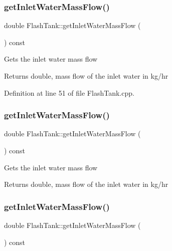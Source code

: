 \subsubsection{\texorpdfstring{get\+Inlet\+Water\+Mass\+Flow()}{getInletWaterMassFlow()}\hspace{0.1cm}{\footnotesize\ttfamily [1/3]}}
{\footnotesize\ttfamily double Flash\+Tank\+::get\+Inlet\+Water\+Mass\+Flow (\begin{DoxyParamCaption}{ }\end{DoxyParamCaption}) const}

Gets the inlet water mass flow \begin{DoxyReturn}{Returns}
double, mass flow of the inlet water in kg/hr 
\end{DoxyReturn}


Definition at line 51 of file Flash\+Tank.\+cpp.

\mbox{\label{class_flash_tank_a2b6dcd9e175a9f2fc550ea91006aa66a}} 
\subsubsection{\texorpdfstring{get\+Inlet\+Water\+Mass\+Flow()}{getInletWaterMassFlow()}\hspace{0.1cm}{\footnotesize\ttfamily [2/3]}}
{\footnotesize\ttfamily double Flash\+Tank\+::get\+Inlet\+Water\+Mass\+Flow (\begin{DoxyParamCaption}{ }\end{DoxyParamCaption}) const}

Gets the inlet water mass flow \begin{DoxyReturn}{Returns}
double, mass flow of the inlet water in kg/hr 
\end{DoxyReturn}
\mbox{\label{class_flash_tank_a2b6dcd9e175a9f2fc550ea91006aa66a}} 
\subsubsection{\texorpdfstring{get\+Inlet\+Water\+Mass\+Flow()}{getInletWaterMassFlow()}\hspace{0.1cm}{\footnotesize\ttfamily [3/3]}}
{\footnotesize\ttfamily double Flash\+Tank\+::get\+Inlet\+Water\+Mass\+Flow (\begin{DoxyParamCaption}{ }\end{DoxyParamCaption}) const}

